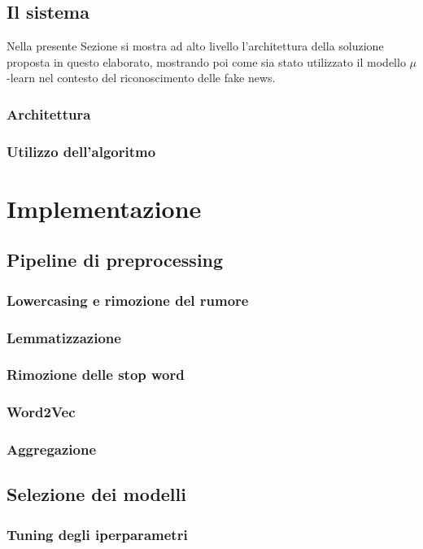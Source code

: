 \documentclass[12pt]{report}
\theoremstyle{definition}
\begin{document}
\section{Il sistema}
\label{sistema}
Nella presente Sezione si mostra ad alto livello l'architettura della soluzione proposta in questo elaborato, mostrando poi come sia stato utilizzato il modello $\mu$-learn nel contesto del riconoscimento delle fake news.
\subsection{Architettura}
\subsection{Utilizzo dell'algoritmo}

\chapter{Implementazione}
\label{Capitolo 3}
\onehalfspacing

\section{Pipeline di preprocessing}
\subsection{Lowercasing e rimozione del rumore}
\subsection{Lemmatizzazione}
\subsection{Rimozione delle stop word}
\subsection{Word2Vec}
\subsection{Aggregazione}
\section{Selezione dei modelli}
\subsection{Tuning degli iperparametri}
\end{document}
